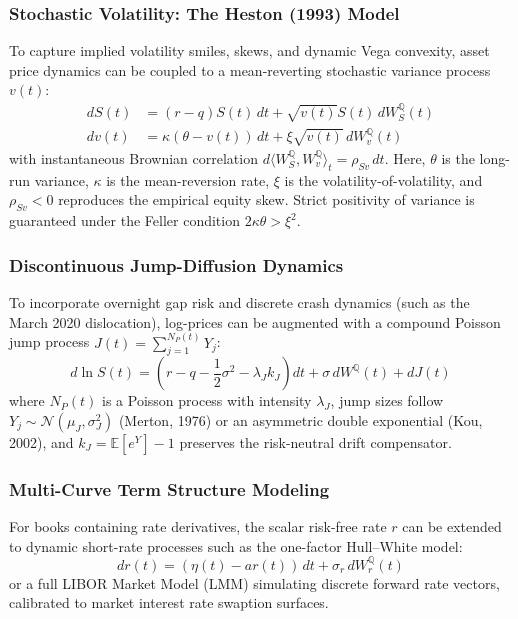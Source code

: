 \documentclass{article}
\theoremstyle{plain}
\theoremstyle{definition}
\theoremstyle{remark}
\begin{document}
\subsubsection{Stochastic Volatility: The Heston (1993) Model}
To capture implied volatility smiles, skews, and dynamic Vega convexity, asset price dynamics can be coupled to a mean-reverting stochastic variance process $v(t)$:
\begin{align}
    dS(t) &= (r - q)S(t)\,dt + \sqrt{v(t)}S(t)\,dW_S^\mathbb{Q}(t) \\
    dv(t) &= \kappa(\theta - v(t))\,dt + \xi\sqrt{v(t)}\,dW_v^\mathbb{Q}(t)
\end{align}
with instantaneous Brownian correlation $d\langle W_S^\mathbb{Q}, W_v^\mathbb{Q} \rangle_t = \rho_{Sv}\,dt$. Here, $\theta$ is the long-run variance, $\kappa$ is the mean-reversion rate, $\xi$ is the volatility-of-volatility, and $\rho_{Sv} < 0$ reproduces the empirical equity skew. Strict positivity of variance is guaranteed under the Feller condition $2\kappa\theta > \xi^2$.

\subsubsection{Discontinuous Jump-Diffusion Dynamics}
To incorporate overnight gap risk and discrete crash dynamics (such as the March 2020 dislocation), log-prices can be augmented with a compound Poisson jump process $J(t) = \sum_{j=1}^{N_P(t)} Y_j$:
\begin{equation}
    d\ln S(t) = \left(r - q - \frac{1}{2}\sigma^2 - \lambda_J k_J\right)dt + \sigma\,dW^\mathbb{Q}(t) + dJ(t)
\end{equation}
where $N_P(t)$ is a Poisson process with intensity $\lambda_J$, jump sizes follow $Y_j \sim \mathcal{N}(\mu_J, \sigma_J^2)$ (Merton, 1976) or an asymmetric double exponential (Kou, 2002), and $k_J = \mathbb{E}[e^Y] - 1$ preserves the risk-neutral drift compensator.

\subsubsection{Multi-Curve Term Structure Modeling}
For books containing rate derivatives, the scalar risk-free rate $r$ can be extended to dynamic short-rate processes such as the one-factor Hull--White model:
\begin{equation}
    dr(t) = (\eta(t) - a r(t))\,dt + \sigma_r\,dW_r^\mathbb{Q}(t)
\end{equation}
or a full LIBOR Market Model (LMM) simulating discrete forward rate vectors, calibrated to market interest rate swaption surfaces.
\end{document}
